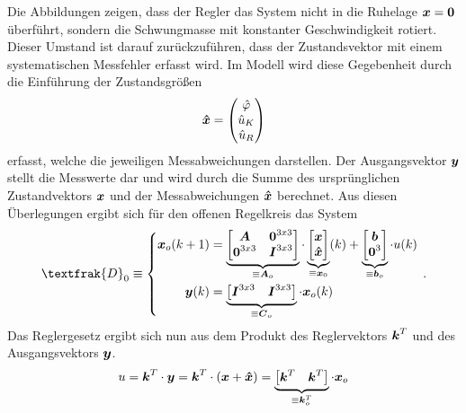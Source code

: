 \newpage
Die Abbildungen zeigen, dass der Regler das System nicht in die Ruhelage $\boldsymbol{x}=\boldsymbol{0}$ überführt, sondern die Schwungmasse mit konstanter Geschwindigkeit rotiert. Dieser Umstand ist darauf zurückzuführen, dass der Zustandsvektor mit einem systematischen Messfehler erfasst wird. Im Modell wird diese Gegebenheit durch die Einführung der Zustandsgrößen
\begin{equation}
\boldsymbol{\hat{x}} = \begin{pmatrix}
\hat{\varphi} \\ \hat{u}_K \\ \hat{u}_R
\end{pmatrix}
\end{equation}
erfasst, welche die jeweiligen Messabweichungen darstellen. Der Ausgangsvektor $\boldsymbol{y}$ stellt die Messwerte dar und wird durch die Summe des ursprünglichen Zustandvektors $\boldsymbol{x}$ und der Messabweichungen $\boldsymbol{\hat{x}}$ berechnet. Aus diesen Überlegungen ergibt sich für den offenen Regelkreis das System
\begin{equation}
\textfrak{D}_0 \equiv \left\{ \begin{split}
\bs{x}_o(k+1) &= \underbrace{\begin{bmatrix}
\bs{A} & \bs{0}^{3x3} \\ \bs{0}^{3x3} & \bs{I}^{3x3}\end{bmatrix}}_{\equiv \bs{A}_o}\cdot \underbrace{\begin{bmatrix}
\bs{x} \\ \bs{\hat{x}}
\end{bmatrix}}_{\equiv \bs{x}_0}(k) + \underbrace{\begin{bmatrix}
\bs{b} \\ \bs{0}^3 \end{bmatrix}}_{\equiv \bs{b}_o} \cdot u(k)
\\
\bs{y}(k) &= \underbrace{\begin{bmatrix}
\bs{I}^{3x3} & \bs{I}^{3x3}\end{bmatrix}}_{\equiv \bs{C}_o}\cdot \bs{x}_o(k)
\end{split}
\right. \,.
\end{equation}
Das Reglergesetz ergibt sich nun aus dem Produkt des Reglervektors $\boldsymbol{k}^T$ und des Ausgangsvektors $\boldsymbol{y}$.
\begin{equation}
u = \boldsymbol{k}^T\cdot \boldsymbol{y} = \boldsymbol{k}^T \cdot (\boldsymbol{x} + \boldsymbol{\hat{x}}) = \underbrace{\begin{bmatrix}
\boldsymbol{k}^T & \boldsymbol{k}^T
\end{bmatrix}}_{\equiv \boldsymbol{k}^T_o} \cdot \boldsymbol{x}_o
\end{equation}

